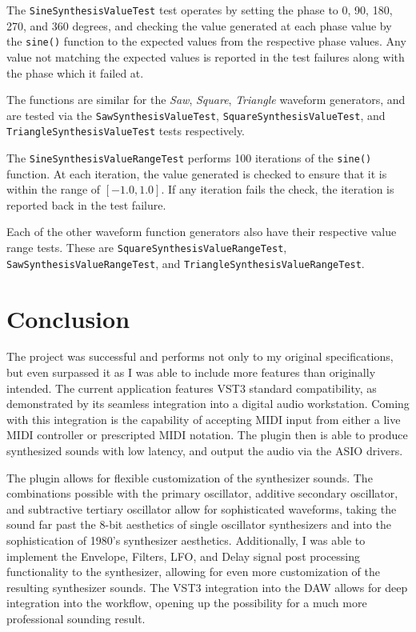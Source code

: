 \documentclass[a4paper,12pt]{report}
\begin{document}
The \texttt{Sine\-Synthesis\-Value\-Test} test operates by setting the phase to 0, 90, 180, 270, and 360 degrees, and checking the value generated at each phase value by the \texttt{sine()} function to the expected values from the respective phase values. Any value not matching the expected values is reported in the test failures along with the phase which it failed at.

The functions are similar for the \emph{Saw}, \emph{Square}, \emph{Triangle} waveform generators, and are tested via the \texttt{Saw\-Synthesis\-Value\-Test}, \texttt{Square\-Synthesis\-Value\-Test}, and \texttt{Triangle\-Synthesis\-Value\-Test} tests respectively.

The \texttt{Sine\-Synthesis\-Value\-Range\-Test} performs 100 iterations of the \texttt{sine()} function. At each iteration, the value generated is checked to ensure that it is within the range of $[-1.0,1.0]$. If any iteration fails the check, the iteration is reported back in the test failure.

Each of the other waveform function generators also have their respective value range tests. These are \texttt{Square\-Synthesis\-Value\-Range\-Test}, \texttt{Saw\-Synthesis\-Value\-Range\-Test}, and \texttt{Triangle\-Synthesis\-Value\-Range\-Test}.

\chapter*{Conclusion}
\label{chapter:results}
The project was successful and performs not only to my original specifications, but even surpassed it as I was able to include more features than originally intended. The current application features VST3 standard compatibility, as demonstrated by its seamless integration into a digital audio workstation. Coming with this integration is the capability of accepting MIDI input from either a live MIDI controller or prescripted MIDI notation. The plugin then is able to produce synthesized sounds with low latency, and output the audio via the ASIO drivers.

The plugin allows for flexible customization of the synthesizer sounds. The combinations possible with the primary oscillator, additive secondary oscillator, and subtractive tertiary oscillator allow for sophisticated waveforms, taking the sound far past the 8-bit aesthetics of single oscillator synthesizers and into the sophistication of 1980's synthesizer aesthetics. Additionally, I was able to implement the Envelope, Filters, LFO, and Delay signal post processing functionality to the synthesizer, allowing for even more customization of the resulting synthesizer sounds. The VST3 integration into the DAW allows for deep integration into the workflow, opening up the possibility for a much more professional sounding result. 
\end{document}
